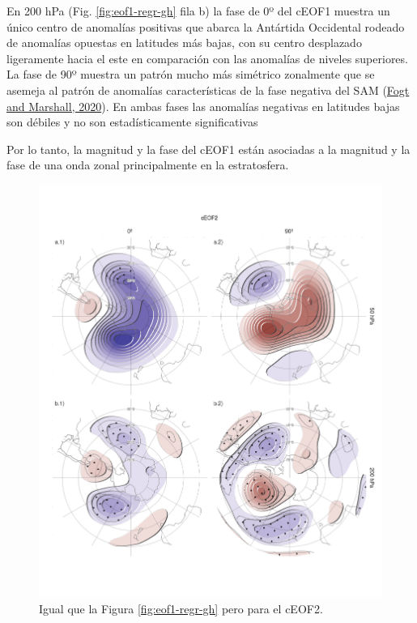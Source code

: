 \documentclass[12pt,oneside,a4paper]{reedthesis}
\begin{document}
En 200 hPa (Fig. \ref{fig:eof1-regr-gh} fila b) la fase de 0º del cEOF1 muestra un único centro de anomalías positivas que abarca la Antártida Occidental rodeado de anomalías opuestas en latitudes más bajas, con su centro desplazado ligeramente hacia el este en comparación con las anomalías de niveles superiores.
La fase de 90º muestra un patrón mucho más simétrico zonalmente que se asemeja al patrón de anomalías características de la fase negativa del SAM (\protect\hyperlink{ref-fogt2020}{Fogt and Marshall, 2020}).
En ambas fases las anomalías negativas en latitudes bajas son débiles y no son estadísticamente significativas

Por lo tanto, la magnitud y la fase del cEOF1 están asociadas a la magnitud y la fase de una onda zonal principalmente en la estratosfera.



\begin{figure}

{\centering \includegraphics{figures/20-ceofs/eof2-regr-gh-1} 

}

\caption{Igual que la Figura \ref{fig:eof1-regr-gh} pero para el cEOF2.}\label{fig:eof2-regr-gh}
\end{figure}
\end{document}
